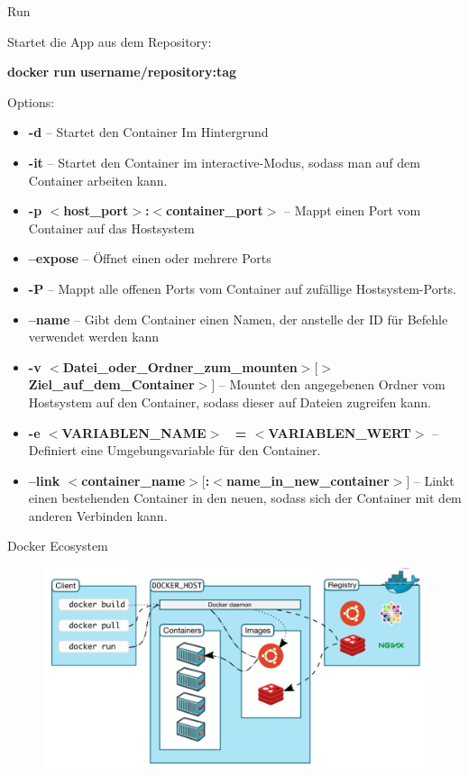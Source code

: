 \documentclass[final]{beamer}
\newlength{\specialcolwid}
\begin{document}
\begin{frame}
\begin{columns}[t]
\begin{column}{\specialcolwid}
\begin{block}{Run}
\par Startet die App aus dem Repository:
\par \textbf{docker run} \textcolor{docker-pu}{} \textcolor{docker-lb}{\textbf{username/repository:tag}}
\vspace{1cm}

\par Options:
\begin{itemize}
\item \textbf{-d} -- Startet den Container Im Hintergrund
\item \textbf{-it} -- Startet den Container im interactive-Modus, sodass man auf dem Container arbeiten kann.
\item \textbf{-p $<$host\_port$>$:$<$container\_port$>$} -- Mappt einen Port vom Container auf das Hostsystem
\item \textbf{--expose} -- Öffnet einen oder mehrere Ports
\item \textbf{-P} -- Mappt alle offenen Ports vom Container auf zufällige Hostsystem-Ports.
\item \textbf{--name} -- Gibt dem Container einen Namen, der anstelle der ID für Befehle verwendet werden kann
\item \textbf{-v $<$Datei\_oder\_Ordner\_zum\_mounten$>[$\:$>$Ziel\_auf\_dem\_Container$>]$} -- Mountet den angegebenen Ordner vom Hostsystem auf den Container, sodass dieser auf Dateien zugreifen kann.
\item \textbf{-e $<$VARIABLEN\_NAME$>$ \ = $<$VARIABLEN\_WERT$>$} -- Definiert eine Umgebungsvariable für den Container.
\item \textbf{--link $<$container\_name$>[$:$<$name\_in\_new\_container$>]$} --  Linkt einen bestehenden Container in den neuen, sodass sich der Container mit dem anderen Verbinden kann.
\end{itemize}


\begin{center}
\vspace{2cm}
Docker Ecosystem
\end{center}
\begin{figure}
\includegraphics[scale=0.8]{eco}
\end{figure}


\end{block}
\end{column}
\end{columns}
\end{frame}
\end{document}

